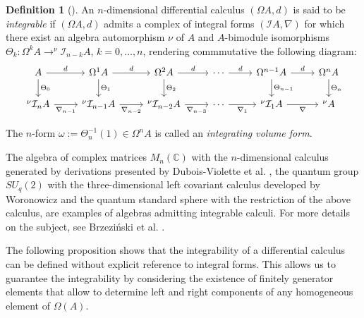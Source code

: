 \documentclass{amsart}
\theoremstyle{definition}
\newtheorem{definition}[theorem]{Definition}
\theoremstyle{remark}
\numberwithin{equation}{section}
\begin{document}
\begin{definition}[{\cite[Definition 2.1]{BrzezinskiSitarz2017}}]
An $n$-dimensional differential calculus $(\Omega A, d)$ is said to be {\em integrable} if $(\Omega A, d)$ admits a complex of integral forms $(\mathcal{I}A, \nabla)$ for which there exist an algebra automorphism $\nu$ of $A$ and $A$-bimodule isomorphisms \linebreak $\Theta_k: \Omega^{k} A \to ^{\nu} \mathcal{I}_{n-k}A$, $k = 0, \dotsc, n$, rendering commmutative the following diagram:
\[
{\large{
\begin{tikzcd}
A \arrow{r}{d} \arrow{d}{\Theta_0} & \Omega^{1} A \arrow{d}{\Theta_1} \arrow{r}{d} & \Omega^2 A  \arrow{d}{\Theta_2} \arrow{r}{d} & \dotsb \arrow{r}{d} & \Omega^{n-1} A \arrow{d}{\Theta_{n-1}} \arrow{r}{d} & \Omega^n A  \arrow{d}{\Theta_n} \\ ^{\nu} \mathcal{I}_n A \arrow[swap]{r}{\nabla_{n-1}} & ^{\nu} \mathcal{I}_{n-1} A \arrow[swap]{r}{\nabla_{n-2}} & ^{\nu} \mathcal{I}_{n-2} A \arrow[swap]{r}{\nabla_{n-3}} & \dotsb \arrow[swap]{r}{\nabla_{1}} & ^{\nu} \mathcal{I}_{1} A \arrow[swap]{r}{\nabla} & ^{\nu} A
\end{tikzcd}
}}
\]

The $n$-form $\omega:= \Theta_n^{-1}(1)\in \Omega^n A$ is called an {\em integrating volume form}. 
\end{definition}

The algebra of complex matrices $M_n(\mathbb{C})$ with the $n$-dimensional calculus generated by derivations presented by Dubois-Violette et al. \cite{DuboisViolette1988, DuboisVioletteKernerMadore1990}, the quantum group $SU_q(2)$ with the three-dimensional left covariant calculus developed by Woronowicz \cite{Woronowicz1987} and the quantum standard sphere with the restriction of the above calculus, are examples of algebras admitting integrable calculi. For more details on the subject, see Brzezi\'nski et al. \cite{BrzezinskiElKaoutitLomp2010}. 

The following proposition shows that the integrability of a differential calculus can be defined without explicit reference to integral forms. This allows us to guarantee the integrability by considering the existence of finitely generator elements that allow to determine left and right components of any homogeneous element of $\Omega(A)$.
\end{document}
